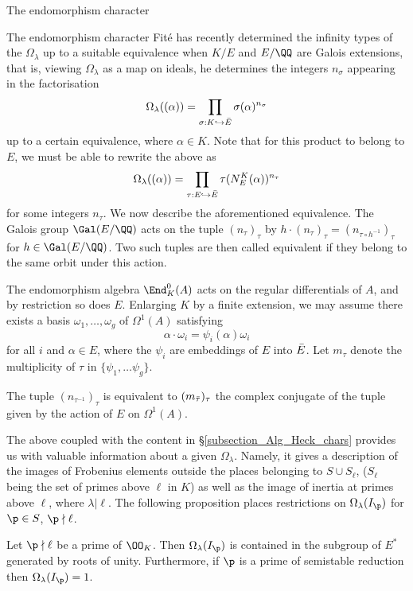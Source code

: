\documentclass[11pt,a4paper]{article}
\newcommand{\lam}{\lambda}
\begin{document}
\begin{section}{The endomorphism character}
\begin{subsection}{The endomorphism character}
Fité has recently determined the infinity types of the $\Omega_\lambda$ up to a suitable equivalence when $K/E$ and $E/\QQ$ are Galois extensions, that is, viewing $\Omega_\lambda$ as a map on ideals, he determines the integers $n_\sigma$ appearing in the factorisation 
\[ \Omega_\lambda((\alpha)) = \prod_{\sigma:K \hookrightarrow \Bar{E}} \sigma(\alpha)^{n_\sigma}
\]
up to a certain equivalence, where $\alpha \in K$. Note that for this product to belong to $E$, we must be able to rewrite the above as
\[ \Omega_\lambda((\alpha)) = \prod_{\tau: E \hookrightarrow \Bar{E}} \tau(N^K_E(\alpha))^{n_\tau}
\]
for some integers $n_\tau$.
We now describe the aforementioned  equivalence.
The Galois group $\Gal(E/\QQ)$ acts on the tuple  $(n_\tau)_\tau$ by $h \cdot (n_\tau)_\tau = (n_{\tau \circ h^{-1}})_\tau$ for $h \in \Gal(E/\QQ)$.
Two such tuples are then called equivalent if they belong to the same orbit under this action.

The endomorphism algebra $\End_K^0(A)$ acts on the regular differentials of $A$, and by restriction so does $E$.
Enlarging $K$ by a finite extension, we may assume there exists a basis $\omega_1,\ldots, \omega_g $ of $\Omega^1(A)$ satisfying
$$\alpha\cdot\omega_i = \psi_i(\alpha)\omega_i$$
for all $i$ and $\alpha \in E$, where the $\psi_i$ are embeddings of $E$ into $\Bar{E}$. Let $m_\tau$ denote the multiplicity of $\tau$ in $\{\psi_1, \ldots \psi_g \}$.  

\begin{theorem}{\cite[Prop. 14]{Fite_Ordinary_primes}}
\label{thm_fite_inf_type_up_to_equiv}
The tuple $(n_{\tau^{-1}})_\tau$ is equivalent to $(m_{\Bar{\tau}})_\tau$ the complex conjugate of the tuple given by the action of $E$ on $\Omega^1(A)$.
\end{theorem}

The above coupled with the content in \S \ref{subsection_Alg_Heck_chars} provides us with valuable information about a given $\Omega_\lambda$.
Namely, it gives a description of the images of Frobenius elements outside the places belonging to $S \cup S_\ell$, ($S_\ell$ being the set of primes above $\ell$ in $K$) as well as the image of inertia at primes above  $\ell$, where $\lambda|\ell$.
The following proposition places restrictions on $\Omega_\lambda(I_\p)$ for $\p \in S$, $\p \nmid \ell$.

\begin{proposition}
\label{prop_endo_car_inertia_at_p_ne_l}
Let $\p \nmid \ell $ be a prime of $ \OO_K$. Then $\Omega_\lam(I_\p)$ is contained in the subgroup of $E^*$ generated by roots of unity.
Furthermore, if $\p$ is a prime of semistable reduction then $\Omega_\lambda(I_\p)=1$.
\end{proposition}


\end{subsection}
\end{section}
\end{document}
